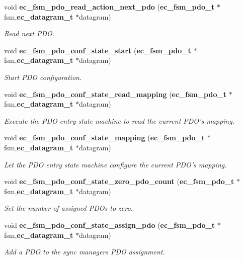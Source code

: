\begin{DoxyCompactItemize}
void {\bf ec\-\_\-fsm\-\_\-pdo\-\_\-read\-\_\-action\-\_\-next\-\_\-pdo} ({\bf ec\-\_\-fsm\-\_\-pdo\-\_\-t} $\ast$fsm,{\bf ec\-\_\-datagram\-\_\-t} $\ast$datagram)
\begin{DoxyCompactList}\small\item\em \-Read next \-P\-D\-O. \end{DoxyCompactList}\item 
void {\bf ec\-\_\-fsm\-\_\-pdo\-\_\-conf\-\_\-state\-\_\-start} ({\bf ec\-\_\-fsm\-\_\-pdo\-\_\-t} $\ast$fsm,{\bf ec\-\_\-datagram\-\_\-t} $\ast$datagram)
\begin{DoxyCompactList}\small\item\em \-Start \-P\-D\-O configuration. \end{DoxyCompactList}\item 
void {\bf ec\-\_\-fsm\-\_\-pdo\-\_\-conf\-\_\-state\-\_\-read\-\_\-mapping} ({\bf ec\-\_\-fsm\-\_\-pdo\-\_\-t} $\ast$fsm,{\bf ec\-\_\-datagram\-\_\-t} $\ast$datagram)
\begin{DoxyCompactList}\small\item\em \-Execute the \-P\-D\-O entry state machine to read the current \-P\-D\-O's mapping. \end{DoxyCompactList}\item 
void {\bf ec\-\_\-fsm\-\_\-pdo\-\_\-conf\-\_\-state\-\_\-mapping} ({\bf ec\-\_\-fsm\-\_\-pdo\-\_\-t} $\ast$fsm,{\bf ec\-\_\-datagram\-\_\-t} $\ast$datagram)
\begin{DoxyCompactList}\small\item\em \-Let the \-P\-D\-O entry state machine configure the current \-P\-D\-O's mapping. \end{DoxyCompactList}\item 
void {\bf ec\-\_\-fsm\-\_\-pdo\-\_\-conf\-\_\-state\-\_\-zero\-\_\-pdo\-\_\-count} ({\bf ec\-\_\-fsm\-\_\-pdo\-\_\-t} $\ast$fsm,{\bf ec\-\_\-datagram\-\_\-t} $\ast$datagram)
\begin{DoxyCompactList}\small\item\em \-Set the number of assigned \-P\-D\-Os to zero. \end{DoxyCompactList}\item 
void {\bf ec\-\_\-fsm\-\_\-pdo\-\_\-conf\-\_\-state\-\_\-assign\-\_\-pdo} ({\bf ec\-\_\-fsm\-\_\-pdo\-\_\-t} $\ast$fsm,{\bf ec\-\_\-datagram\-\_\-t} $\ast$datagram)
\begin{DoxyCompactList}\small\item\em \-Add a \-P\-D\-O to the sync managers \-P\-D\-O assignment. \end{DoxyCompactList}\item 

\end{DoxyCompactItemize}
